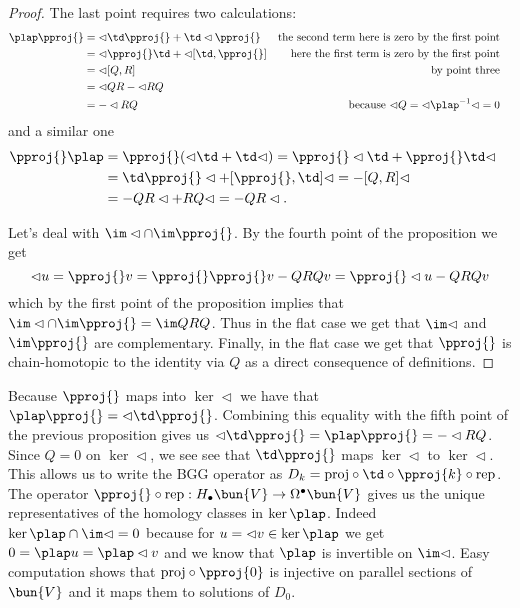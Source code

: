 \begin{proof}
The last point requires two calculations:
\begin{align*}
 \plap \pproj{} & = \lhd\td \pproj{} + \td\lhd\pproj{} & \text{the second term here is zero by the first point}\\
		& = \lhd\pproj{}\td + \lhd[\td,\pproj{}] & \text{here the first term is zero by the first point} \\
		& = \lhd[Q,R] &\text{by point three} &\\
		& = \lhd Q R - \lhd R Q&\\
		& = -\lhd R Q &\text{because $\lhd Q = \lhd\plap^{-1} \lhd = 0$}
\end{align*}
and a similar one
\begin{align*}
 \pproj{} \plap & = \pproj{}(\lhd\td+\td\lhd) = \pproj{}\lhd\td + \pproj{}\td\lhd  &\\
		& = \td\pproj{}\lhd + [\pproj{},\td]\lhd= -[Q,R]\lhd &  \\
		& = -QR\lhd + RQ\lhd = -QR\lhd.
\end{align*}

Let's deal with $\im\lhd\cap\im\pproj{}$. By the fourth point of the proposition we get
\[
 \lhd u = \pproj{} v = \pproj{} \pproj{} v - QRQ v= \pproj{} \lhd u  -QRQ v
\]
which by the first point of the proposition implies that $\im \lhd \cap \im \pproj{} = \im QRQ$. Thus in the flat case we get that $\im \lhd$ and $\im \pproj{}$ are complementary. Finally, in the flat case we get  that $\pproj{}$ is chain-homotopic to the identity via $Q$ as a direct consequence of definitions.
\end{proof}

Because $\pproj{}$ maps into $\ker \lhd$ we have that $\plap \pproj{} = \lhd\td\pproj{}$. Combining this equality with the fifth point of the previous proposition gives us $\lhd\td\pproj{} = \plap\pproj{}= -\lhd RQ$. Since $Q=0$ on $\ker\lhd$, we see  see that $\td\pproj{}$ maps $\ker \lhd$ to $\ker \lhd$. This allows us to write the BGG operator as $D_k=\mathrm{proj} \circ \td \circ \pproj{k} \circ \mathrm{rep}$. The operator $\pproj{}\circ\mathrm{rep}: H_\bullet\bun{V}\to\Omega^\bullet\bun{V}$ gives us the unique representatives of the homology classes in $\ker \plap$. Indeed $\ker \plap \cap \im \lhd = 0$ because for $u=\lhd v \in \ker \plap$ we get $0=\plap u = \plap \lhd v$ and we know that $\plap$ is invertible on $\im \lhd$. Easy computation shows that $\mathrm{proj}\circ \pproj{0}$ is injective on parallel sections of $\bun{V}$ and it maps them to solutions of $D_0$.

